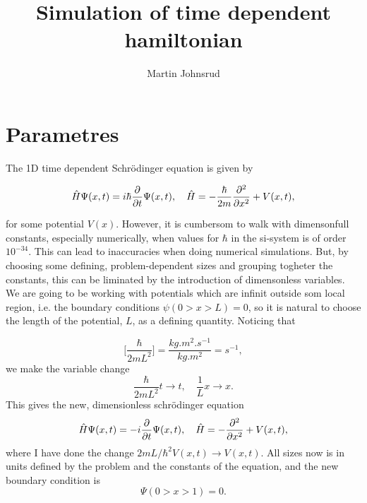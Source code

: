\documentclass{article}
\title{Simulation of time dependent hamiltonian}
\author{Martin Johnsrud}
\date{}
\begin{document}
\maketitle

\section*{Parametres}

    The 1D time dependent Schrödinger equation is given by

    \begin{equation*}
        \hat H \Psi(x, t) = i \hbar \pdv{t} \Psi(x, t), \quad \hat H = -\frac{\hbar}{2m}\pdv[2]{x} + V(x, t),
    \end{equation*}

    for some potential $V(x)$. However, it is cumbersom to walk with dimensonfull constants, especially numerically, when values for $\hbar$ in the si-system is of order $10^{-34}$. This can lead to inaccuracies when doing numerical simulations. But, by choosing some defining, problem-dependent sizes and grouping togheter the constants, this can be liminated by the introduction of dimensonless variables. We are going to be working with potentials which are infinit outside som local region, i.e. the boundary conditions $\psi(0>x>L) = 0$, so it is natural to choose the length of the potential, $L$, as a defining quantity. Noticing that

    \begin{equation*}
        \bigg[\frac{\hbar}{2 m L^2} \bigg] = \frac{\si{kg.m^2.s^{-1}}}{\si{kg.m^2}} = \si{s^{-1}},
    \end{equation*}
    we make the variable change
    \begin{equation*}
        \frac{\hbar}{2 m L^2}t \rightarrow t, \quad \frac{1}{L}x \rightarrow x.
    \end{equation*}
    This gives the new, dimensionless schrödinger equation
    \begin{equation}
        \hat H \Psi(x, t) = -i \pdv{t} \Psi(x, t), \quad \hat H = -\pdv[2]{x} + V(x, t),
        \label{time_depend}
    \end{equation}
    where I have done the change $2mL/\hbar^2V(x, t) \rightarrow V(x, t)$. All sizes now is in units defined by the problem and the constants of the equation, and the new boundary condition is 
    \begin{equation*}
        \Psi(0>x>1) = 0.
    \end{equation*}
\end{document}
